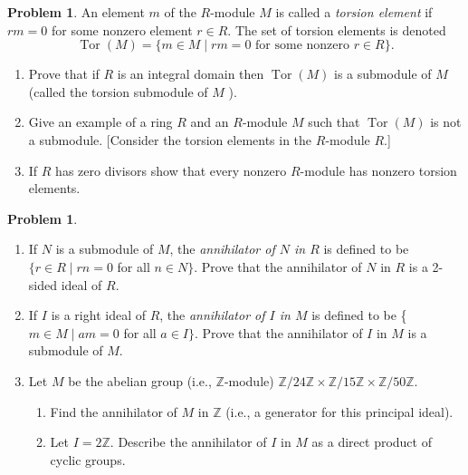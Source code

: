 \documentclass{amsart}
\numberwithin{equation}{section}
\theoremstyle{definition}
\newtheorem{problem}[thm]{Problem}
\begin{document}
\begin{problem}
  An element \(m\) of the \(R\)-module \(M\) is called a \emph{torsion
  element} if \(r m=0\) for some nonzero element \(r \in R\). The set
  of torsion elements is denoted
\[
\operatorname{Tor}(M)=\{m \in M \mid r m=0 \text { for some nonzero } r \in R\} .
\]
\begin{enumerate}
\item Prove that if \(R\) is an integral domain then \(\operatorname{Tor}(M)\) is a submodule of \(M\) (called the torsion submodule of \(M\) ).
\item  Give an example of a ring \(R\) and an \(R\)-module \(M\) such that \(\operatorname{Tor}(M)\) is not a submodule. [Consider the torsion elements in the \(R\)-module \(R\).]
\item If \(R\) has zero divisors show that every nonzero \(R\)-module has nonzero torsion elements.
\end{enumerate}
\end{problem}



\begin{problem}
  \begin{enumerate}
  \item If \(N\) is a submodule of \(M\), the \emph{annihilator of \(N\) in \(R\) } is defined to be \(\{r \in R \mid r n=0\) for all
    \(n \in N\}\). Prove that the annihilator of \(N\) in \(R\) is a
    2-sided ideal of \(R\).
  \item If \(I\) is a right ideal of \(R\), the \emph{annihilator of \(I\) in \(M\)} is defined to be \{ \(m \in M \mid a m=0\) for all \(a \in I\}\). Prove that the annihilator of \(I\) in \(M\) is a submodule of \(M\).
  \item Let \(M\) be the abelian group (i.e., \(\mathbb{Z}\)-module) \(\mathbb{Z} / 24 \mathbb{Z} \times \mathbb{Z} / 15 \mathbb{Z} \times \mathbb{Z} / 50 \mathbb{Z}\).
    \begin{enumerate}
    \item Find the annihilator of \(M\) in \(\mathbb{Z}\) (i.e., a generator for this principal ideal).
    \item Let \(I=2 \mathbb{Z}\). Describe the annihilator of \(I\) in \(M\) as a direct product of cyclic groups.
    \end{enumerate}
  \end{enumerate}
\end{problem}
\end{document}
